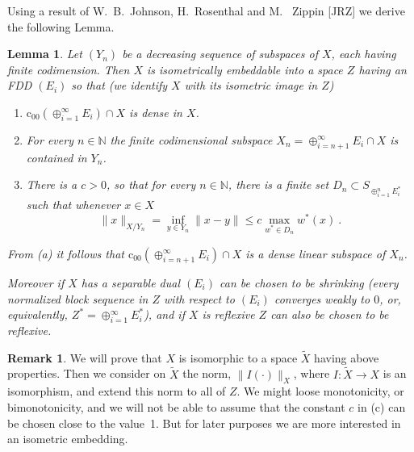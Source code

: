 \documentclass[11pt,leqno]{amsart}
\newtheorem{lem}[thm]{Lemma}
\theoremstyle{definition}
\newtheorem*{remark}{Remark}
\newcommand{\ds}{\displaystyle}
\newcommand{\coo}{\mbox{c}_{00}}
\newcommand{\N}{\mathbb{N}}
\begin{document}
Using a result of  W.~B.~Johnson, H.~Rosenthal and M.~ Zippin [JRZ]
we derive the following Lemma.
 
\begin{lem}\label{L1}
Let $(Y_n)$ be a decreasing sequence of subspaces of $X$, each  
having finite codimension.
Then $X$ is isometrically embeddable into a space $Z$
having an FDD $(E_i)$ so that
(we identify $X$ with its isometric image in $Z$)
\begin{enumerate}
\item[a)]   $\coo(\oplus_{i=1}^\infty E_i)\cap X$ is dense in $X$. 
\item[b)]  For every $n\in\N$ the finite codimensional 
subspace $X_n=\oplus_{i=n+1}^\infty E_i\cap X $ 
is contained in $Y_n$.
\item[c)]  There is a $c>0$, so that for every $n\in\N$, there is a finite
set $D_n\subset S_{\ds\oplus_{i=1}^n E_i^*}$ such that 
whenever $x\in X$ 
\begin{equation}\label{E4e}
\|x\|_{X/Y_n}=\inf_{y\in Y_n}\|x-y\|
\le c\max_{w^*\in D_n} w^*(x) \ .
\end{equation}
\end{enumerate}
{From} (a) it follows that   $\coo (\oplus_{i=n+1}^\infty E_i)\cap X$ 
is a dense linear subspace of $X_n$.

Moreover if $X$ has a separable dual $(E_i)$ can be chosen to be shrinking
(every normalized block sequence in $Z$ with respect to $(E_i)$ converges
weakly to $0$, or, equivalently, $Z^* =\oplus_{i=1}^\infty E_i^*$), 
and if $X$ is reflexive $Z$ can also be chosen to be reflexive.  
\end{lem}
   
\begin{remark} 
We will  prove that $X$ is isomorphic to a space 
$\tilde X$ having above properties.
Then we consider on $\tilde X$ the norm, $\| I(\cdot)\|_X$, where 
$I: \tilde X\to X$ is an isomorphism,
and extend this norm to all of $Z$. 
We might loose monotonicity, or bimonotonicity, and we will not be able to 
assume that the constant $c$ in (c) can be chosen close to the value~1. 
But for later purposes we are more interested in an isometric embedding.
\end{remark}
   
\end{document}
